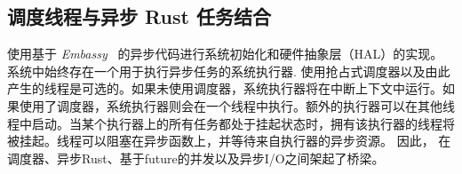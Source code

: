 \subsection{调度线程与异步 Rust 任务结合}\label{sec:design:async}

\OSname{} 使用基于 \emph{Embassy}~\cite{embassy} 的异步代码进行系统初始化和硬件抽象层（HAL）的实现。
系统中始终存在一个用于执行异步任务的系统执行器.
使用抢占式调度器以及由此产生的线程是可选的。如果未使用调度器，系统执行器将在中断上下文中运行。如果使用了调度器，系统执行器则会在一个线程中执行。额外的执行器可以在其他线程中启动。当某个执行器上的所有任务都处于挂起状态时，拥有该执行器的线程将被挂起。线程可以阻塞在异步函数上，并等待来自执行器的异步资源。
因此，\OSname{} 在调度器、异步Rust、基于future的并发以及异步I/O之间架起了桥梁。




% 


